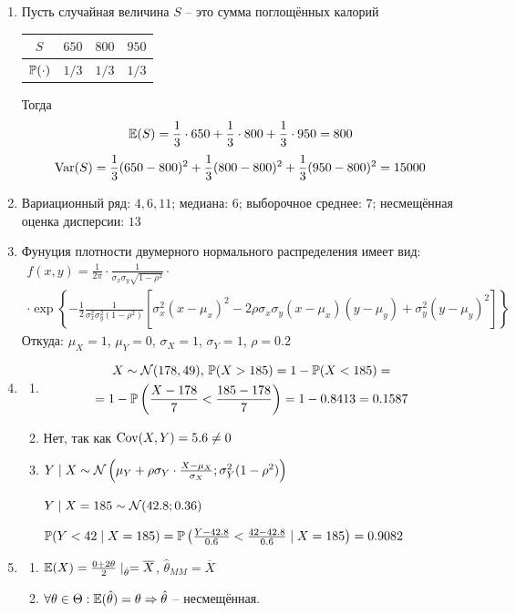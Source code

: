 \begin{enumerate}
\item Пусть случайная величина $S$ – это сумма поглощённых калорий

\begin{tabular}{cccc}
\toprule
$S$ & $650$ & $800$ & $950$ \\ \midrule
$\P(\cdot)$ & $1/3$ & $1/3$ & $1/3$ \\ \bottomrule
\end{tabular}

Тогда
\[
\E(S) = \frac{1}{3}\cdot 650 +  \frac{1}{3}\cdot 800 +  \frac{1}{3}\cdot 950 = 800
\]
\[
\Var(S) = \frac{1}{3}(650-800)^2 + \frac{1}{3}(800-800)^2 + \frac{1}{3}(950-800)^2 = 15000
\]
\item Вариационный ряд: $4, 6, 11$; медиана: $6$; выборочное среднее: $7$; несмещённая оценка дисперсии: $13$
\item Фунуция плотности двумерного нормального распределения имеет вид:
\begin{multline*}
f(x,y) =  \frac{1}{2\pi}\cdot \frac{1}{\sigma_x \sigma_y \sqrt{1-\rho^2}} \cdot \\
\cdot \exp\left\{{-\frac{1}{2}\frac{1}{\sigma_x^2 \sigma_y^2(1-\rho^2)}\left[\sigma_x^2(x-\mu_x)^2-2\rho\sigma_x\sigma_y(x-\mu_x)(y-\mu_y)+\sigma_y^2(y-\mu_y)^2\right]}\right\}
\end{multline*}
Откуда: $\mu_X=1$, $\mu_Y=0$, $\sigma_X = 1$, $\sigma_Y = 1$, $\rho = 0.2$

\item
\begin{enumerate}
\item \begin{multline*}
X \sim \cN(178, 49)$, $\P(X>185) = 1  - \P(X<185) = \\
= 1- \P\left(\frac{X-178}{7} < \frac{185-178}{7}\right) = 1 - 0.8413 = 0.1587
\end{multline*}
\item Нет, так как $\Cov(X, Y) = 5.6 \neq 0$
\item $Y \mid X \sim \cN\left(\mu_Y + \rho\sigma_Y\cdot\frac{X-\mu_X}{\sigma_X}; \sigma_Y^2(1-\rho^2)\right)$

$Y \mid X=185 \sim \cN(42.8;0.36)$

$\P(Y<42 \mid X=185) = \P\left(\frac{Y-42.8}{0.6} < \frac{42-42.8}{0.6}\mid X=185\right) = 0.9082$
\end{enumerate}

\item
\begin{enumerate}
\item $\E(X) = \frac{0+2\theta}{2}\mid_{\hat{\theta}} = \overline{X}$, $\hat{\theta}_{MM} = \overline{X}$
\item $\forall \theta \in \Theta: \E(\hat{\theta})=\theta \Rightarrow \hat{\theta}$ – несмещённая.


\end{enumerate}
\end{enumerate}
